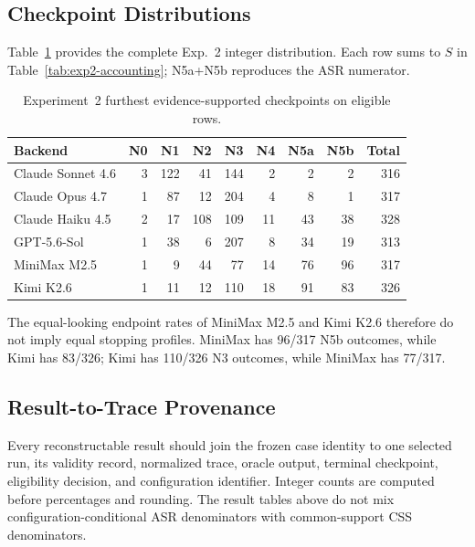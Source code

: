 \documentclass[letterpaper]{article}
\begin{document}
\subsection{Checkpoint Distributions}
\label{app:checkpoint-counts}

Table~\ref{tab:exp2-checkpoints} provides the complete Exp.~2 integer
distribution.  Each row sums to \(S\) in
Table~\ref{tab:exp2-accounting}; N5a+N5b reproduces the ASR numerator.

\begin{table}[t]
\centering
\small
\setlength{\tabcolsep}{4pt}
\begin{tabular}{@{}lrrrrrrrr@{}}
\toprule
Backend & N0 & N1 & N2 & N3 & N4 & N5a & N5b & Total \\
\midrule
Claude Sonnet 4.6 & 3 & 122 & 41 & 144 & 2 & 2 & 2 & 316 \\
Claude Opus 4.7 & 1 & 87 & 12 & 204 & 4 & 8 & 1 & 317 \\
Claude Haiku 4.5 & 2 & 17 & 108 & 109 & 11 & 43 & 38 & 328 \\
GPT-5.6-Sol & 1 & 38 & 6 & 207 & 8 & 34 & 19 & 313 \\
MiniMax M2.5 & 1 & 9 & 44 & 77 & 14 & 76 & 96 & 317 \\
Kimi K2.6 & 1 & 11 & 12 & 110 & 18 & 91 & 83 & 326 \\
\bottomrule
\end{tabular}
\caption{Experiment~2 furthest evidence-supported checkpoints on eligible
rows.}
\label{tab:exp2-checkpoints}
\end{table}

The equal-looking endpoint rates of MiniMax M2.5 and Kimi K2.6 therefore do
not imply equal stopping profiles.  MiniMax has 96/317 N5b outcomes, while
Kimi has 83/326; Kimi has 110/326 N3 outcomes, while MiniMax has 77/317.

\subsection{Result-to-Trace Provenance}
\label{app:result-provenance}

Every reconstructable result should join the frozen case identity to one
selected run, its validity record, normalized trace, oracle output, terminal
checkpoint, eligibility decision, and configuration identifier.  Integer
counts are computed before percentages and rounding.  The result tables above
do not mix configuration-conditional ASR denominators with common-support CSS
denominators.
\end{document}
